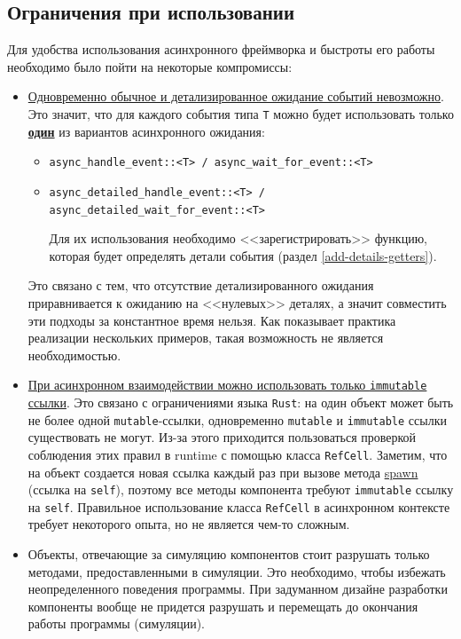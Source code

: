 \subsection{Ограничения при использовании}
Для удобства использования асинхронного фреймворка и быстроты его работы необходимо было пойти на некоторые компромиссы: 
\begin{itemize}
    \item 
    \underline{Одновременно обычное и детализированное ожидание событий невозможно}. Это значит, что для каждого события типа \texttt{T} можно будет использовать только \textbf{\underline{один}} из вариантов асинхронного ожидания: 
    \begin{itemize}
        \item \texttt{async\_handle\_event::<T> / async\_wait\_for\_event::<T>}
        \item \texttt{async\_detailed\_handle\_event::<T> / async\_detailed\_wait\_for\_event::<T>} 
        
        Для их использования необходимо <<зарегистрировать>> функцию, которая будет определять детали события (раздел \ref{add-details-getters}). 
    \end{itemize}
    Это связано с тем, что отсутствие детализированного ожидания приравнивается к ожиданию на <<нулевых>> деталях, а значит совместить эти подходы за константное время нельзя. Как показывает практика реализации нескольких примеров, такая возможность не является необходимостью.
     
    \item 
    \underline{При асинхронном взаимодействии можно использовать только \texttt{immutable} ссылки}. Это связано с ограничениями языка \texttt{Rust}: на один объект может быть не более одной \texttt{mutable}-ссылки, одновременно \texttt{mutable} и \texttt{immutable} ссылки существовать не могут. Из-за этого приходится пользоваться проверкой соблюдения этих правил в runtime с помощью класса \texttt{RefCell}. Заметим, что на объект создается новая ссылка каждый раз при вызове метода \hyperref[spawn]{spawn} (ссылка на \texttt{self}), поэтому все методы компонента требуют \texttt{immutable} ссылку на \texttt{self}. Правильное использование класса \texttt{RefCell} в асинхронном контексте требует некоторого опыта, но не является чем-то сложным.
     
    \item 
    Объекты, отвечающие за симуляцию компонентов стоит разрушать только методами, предоставленными в симуляции. Это необходимо, чтобы избежать неопределенного поведения программы. При задуманном дизайне разработки компоненты вообще не придется разрушать и перемещать до окончания работы программы (симуляции).
    
\end{itemize}

